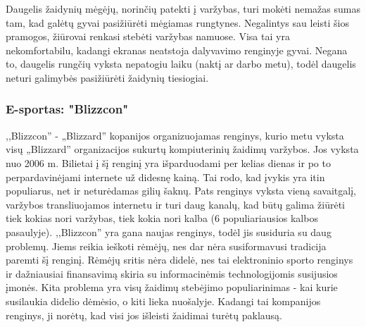\documentclass{VUMIFPSkursinis}
\begin{document}
        Daugelis žaidynių mėgėjų, norinčių patekti į varžybas, turi mokėti nemažas sumas tam, kad galėtų gyvai pasižiūrėti mėgiamas rungtynes. Negalintys sau
        leisti šios pramogos, žiūrovai renkasi stebėti varžybas namuose. Visa tai yra nekomfortabilu, kadangi ekranas neatstoja dalyvavimo renginyje gyvai.
        Negana to, daugelis rungčių vyksta nepatogiu laiku (naktį ar darbo metu), todėl daugelis neturi galimybės pasižiūrėti žaidynių tiesiogiai.
    \subsubsection*{E-sportas: "Blizzcon"} \label{isorineVersloProcesoAnalize_esamuSistemuAnalize_blizzcon}
       \label{isorineVersloProcesoAnalize_esamuSistemuAnalize_blizzcon_veikimas}
        ,,Blizzcon'' - „Blizzard” kopanijos organizuojamas renginys, kurio metu vyksta visų „Blizzard” organizacijos sukurtų kompiuterinių žaidimų varžybos.
        Jos vyksta nuo 2006 m. Bilietai į šį renginį yra išparduodami per kelias dienas ir po to perpardavinėjami internete už didesnę kainą. Tai rodo,
        kad įvykis yra itin populiarus, net ir neturėdamas gilių šaknų. Pats renginys vyksta vieną savaitgalį, varžybos transliuojamos internetu ir turi
        daug kanalų, kad būtų galima žiūrėti tiek kokias nori varžybas, tiek kokia nori kalba (6 populiariausios kalbos pasaulyje).
       \label{isorineVersloProcesoAnalize_esamuSistemuAnalize_blizzcon_trukumai}
        ,,Blizzcon'' yra gana naujas renginys, todėl jis susiduria su daug problemų. Jiems reikia ieškoti rėmėjų, nes dar nėra susiformavusi tradicija
        paremti šį renginį. Rėmėjų sritis nėra didelė, nes tai elektroninio sporto renginys ir dažniausiai finansavimą skiria su informacinėmis technologijomis
        susijusios įmonės. Kita problema yra visų žaidimų stebėjimo populiarinimas - kai kurie susilaukia didelio dėmėsio, o kiti lieka nuošalyje. Kadangi tai
        kompanijos renginys, ji norėtų, kad visi jos išleisti žaidimai turėtų paklausą.
\end{document}

